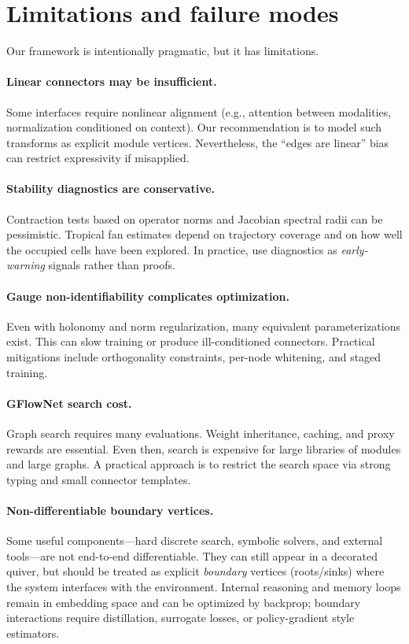 \documentclass[11pt]{article}
\theoremstyle{definition}
\theoremstyle{plain}
\theoremstyle{remark}
\begin{document}
\newpage

\section{Limitations and failure modes}
\label{sec:limitations}

Our framework is intentionally pragmatic, but it has limitations.

\paragraph{Linear connectors may be insufficient.}
Some interfaces require nonlinear alignment (e.g., attention between modalities, normalization conditioned on context).
Our recommendation is to model such transforms as explicit module vertices.
Nevertheless, the ``edges are linear'' bias can restrict expressivity if misapplied.

\paragraph{Stability diagnostics are conservative.}
Contraction tests based on operator norms and Jacobian spectral radii can be pessimistic.
Tropical fan estimates depend on trajectory coverage and on how well the occupied cells have been explored.
In practice, use diagnostics as \emph{early-warning} signals rather than proofs.

\paragraph{Gauge non-identifiability complicates optimization.}
Even with holonomy and norm regularization, many equivalent parameterizations exist.
This can slow training or produce ill-conditioned connectors.
Practical mitigations include orthogonality constraints, per-node whitening, and staged training.

\paragraph{GFlowNet search cost.}
Graph search requires many evaluations.
Weight inheritance, caching, and proxy rewards are essential.
Even then, search is expensive for large libraries of modules and large graphs.
A practical approach is to restrict the search space via strong typing and small connector templates.

\paragraph{Non-differentiable boundary vertices.}
Some useful components---hard discrete search, symbolic solvers, and external tools---are not end-to-end differentiable.
They can still appear in a decorated quiver, but should be treated as explicit \emph{boundary} vertices (roots/sinks) where the system interfaces with the environment.
Internal reasoning and memory loops remain in embedding space and can be optimized by backprop; boundary interactions require distillation, surrogate losses, or policy-gradient style estimators.
\end{document}

